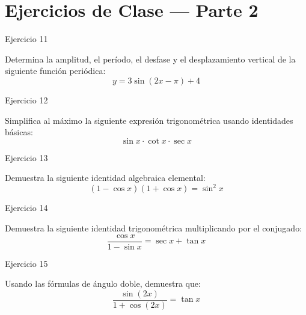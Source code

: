 \documentclass[aspectratio=169]{beamer}
\begin{document}
\section{Ejercicios de Clase — Parte 2}

\begin{frame}{Ejercicio 11}
  \begin{mwejercicio}
    Determina la amplitud, el período, el desfase y el desplazamiento vertical de la siguiente función periódica:
    $$y = 3 \sin(2x - \pi) + 4$$
  \end{mwejercicio}
  \vspace{3.5cm}
\end{frame}
\begin{frame}{Ejercicio 12}
  \begin{mwejercicio}
    Simplifica al máximo la siguiente expresión trigonométrica usando identidades básicas:
    $$\sin x \cdot \cot x \cdot \sec x$$
  \end{mwejercicio}
  \vspace{3.5cm}
\end{frame}
\begin{frame}{Ejercicio 13}
  \begin{mwejercicio}
    Demuestra la siguiente identidad algebraica elemental:
    $$(1 - \cos x)(1 + \cos x) = \sin^2 x$$
  \end{mwejercicio}
  \vspace{3.5cm}
\end{frame}
\begin{frame}{Ejercicio 14}
  \begin{mwejercicio}
    Demuestra la siguiente identidad trigonométrica multiplicando por el conjugado:
    $$\frac{\cos x}{1 - \sin x} = \sec x + \tan x$$
  \end{mwejercicio}
  \vspace{3.5cm}
\end{frame}
\begin{frame}{Ejercicio 15}
  \begin{mwejercicio}
    Usando las fórmulas de ángulo doble, demuestra que:
    $$\frac{\sin(2x)}{1 + \cos(2x)} = \tan x$$
  \end{mwejercicio}
  \vspace{3.5cm}
\end{frame}
\end{document}
